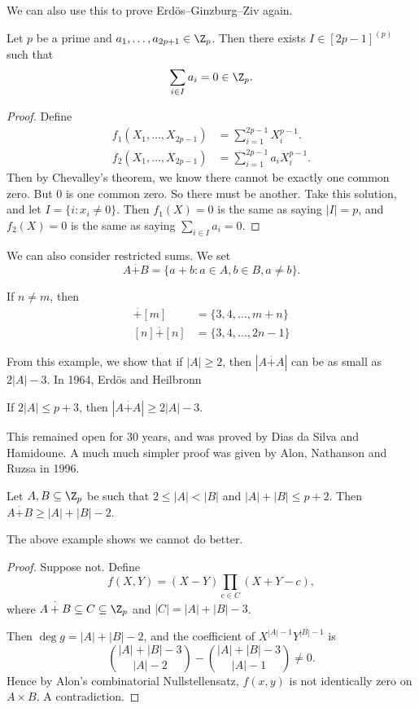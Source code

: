 \documentclass[a4paper]{article}
\begin{document}
We can also use this to prove Erd\"os--Ginzburg--Ziv again.
\begin{thm}
  Let $p$ be a prime and $a_1, \ldots, a_{2p + 1} \in \Z_p$. Then there exists $I \in [2p - 1]^{(p)}$ such that
  \[
    \sum_{i \in I} a_i = 0\in \Z_p.
  \]
\end{thm}

\begin{proof}
  Define
  \begin{align*}
    f_1(X_1, \ldots, X_{2p - 1}) &= \sum_{i = 1}^{2p - 1} X_i^{p - 1}.\\
    f_2(X_1, \ldots, X_{2p - 1}) &= \sum_{i = 1}^{2p - 1} a_i X_i^{p - 1}.
  \end{align*}
  Then by Chevalley's theorem, we know there cannot be exactly one common zero. But $0$ is one common zero. So there must be another. Take this solution, and let $I = \{i : x_i \not= 0\}$. Then $f_1(X) = 0$ is the same as saying $|I| = p$, and $f_2(X) = 0$ is the same as saying $\sum_{i \in I} a_i = 0$.
\end{proof}

We can also consider restricted sums\index{$\overset{\cdot}{+}$}. We set
\[
  A \overset{\cdot}{+} B = \{a + b: a \in A, b \in B, a \not= b\}.
\]
\begin{eg}
  If $n \not= m$, then
  \begin{align*}
    [n] \overset{\cdot}{+} [m] &= \{3, 4, \ldots, m + n\}\\
    [n] \overset{\cdot}{+} [n] &= \{3, 4, \ldots, 2n - 1\}
  \end{align*}
\end{eg}
From this example, we show that if $|A| \geq 2$, then $|A \overset{\cdot}{+} A|$ can be as small as $2|A| - 3$. In 1964, Erd\"os and Heilbronn
\begin{conjecture}
  If $2|A|\leq p + 3$, then $|A \overset{\cdot}{+} A| \geq 2|A| - 3$.
\end{conjecture}
This remained open for $30$ years, and was proved by Dias da Silva and Hamidoune. A much much simpler proof was given by Alon, Nathanson and Ruzsa in 1996.
\begin{thm}
  Let $A, B \subseteq \Z_p$ be such that $2 \leq |A| < |B|$ and $|A| + |B| \leq p + 2$. Then $A \overset{\cdot}{+} B \geq |A| + |B| - 2$.
\end{thm}
The above example shows we cannot do better.

\begin{proof}
  Suppose not. Define
  \[
    f(X, Y) = (X - Y) \prod_{c \in C} (X + Y - c),
  \]
  where $A \overset{\cdot}{+} B \subseteq C \subseteq \Z_p$ and $|C| = |A| + |B| - 3$.

  Then $\deg g = |A| + |B| - 2$, and the coefficient of $X^{|A| - 1} Y^{|B| - 1}$ is
  \[
    \binom{|A| + |B| - 3}{|A| - 2} - \binom{|A| + |B| - 3}{|A| - 1} \not= 0.
  \]
  Hence by Alon's combinatorial Nullstellensatz, $f(x, y)$ is not identically zero on $A \times B$. A contradiction.
\end{proof}
\end{document}
